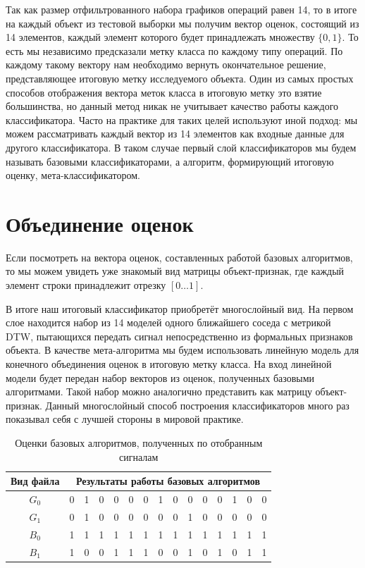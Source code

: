 Так как размер отфильтрованного набора графиков операций равен 14, то в итоге на каждый объект из тестовой выборки мы получим вектор оценок, состоящий из 14 элементов, каждый элемент которого будет принадлежать множеству $\{0, 1\}$. То есть мы независимо предсказали метку класса по каждому типу операций. По каждому такому вектору нам необходимо вернуть окончательное решение, представляющее итоговую метку исследуемого объекта. Один из самых простых способов отображения вектора меток класса в итоговую метку это взятие большинства, но данный метод никак не учитывает качество работы каждого классификатора. Часто на практике для таких целей используют иной подход: мы можем рассматривать каждый вектор из 14 элементов как входные данные для другого классификатора. В таком случае первый слой классификаторов мы будем называть базовыми классификаторами, а алгоритм, формирующий итоговую оценку, мета-классификатором.

\section{Объединение оценок}

Если посмотреть на вектора оценок, составленных работой базовых алгоритмов, то мы можем увидеть уже знакомый вид матрицы объект-признак, где каждый элемент строки принадлежит отрезку $[0 \dots 1]$.

В итоге наш итоговый классификатор приобретёт многослойный вид. На первом слое находится набор из 14 моделей одного ближайшего соседа с метрикой DTW, пытающихся передать сигнал непосредственно из формальных признаков объекта.
В качестве мета-алгоритма мы будем использовать линейную модель для конечного объединения оценок в итоговую метку класса.
На вход линейной модели будет передан набор векторов из оценок, полученных базовыми алгоритмами.
Такой набор можно аналогично представить как матрицу объект-признак.
Данный многослойный способ построения классификаторов много раз показывал себя с лучшей стороны в мировой практике.

\bgroup
\def\arraystretch{1.5}%
\begin{table}[ht]
\caption{Оценки базовых алгоритмов, полученных по отобранным сигналам}
\label{tab_weight}
\centering
    \begin{tabular}{|c|c|c|c|c|c|c|c|c|c|c|c|c|c|c|}
    \hline Вид файла & \multicolumn{14}{c|}{Результаты работы базовых алгоритмов} \\
	\hline $G_0$ & 0 & 1 & 0 & 0 & 0 & 0 & 1 & 0 & 0 & 0 & 0 & 1 & 0 & 0 \\
	\hline $G_1$ & 0 & 1 & 0 & 0 & 0 & 0 & 0 & 0 & 1 & 0 & 0 & 0 & 0 & 0 \\
	\hline $B_0$ & 1 & 1 & 1 & 1 & 1 & 1 & 1 & 1 & 1 & 1 & 1 & 1 & 1 & 1 \\
	\hline $B_1$ & 1 & 0 & 0 & 1 & 1 & 1 & 0 & 0 & 1 & 0 & 1 & 0 & 1 & 1 \\

	\hline
    \end{tabular}
\end{table}
\egroup

